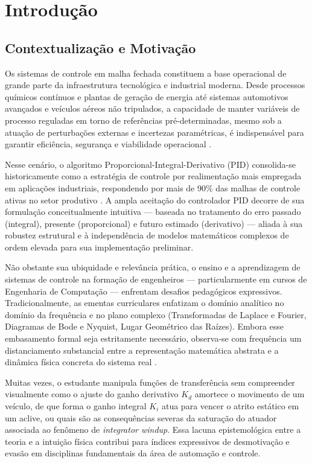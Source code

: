 \chapter{Introdução}
\label{cap:introducao}

\section{Contextualização e Motivação}
\label{sec:contextualizacao}

Os sistemas de controle em malha fechada constituem a base operacional de grande parte da infraestrutura tecnológica e industrial moderna. Desde processos químicos contínuos e plantas de geração de energia até sistemas automotivos avançados e veículos aéreos não tripulados, a capacidade de manter variáveis de processo reguladas em torno de referências pré-determinadas, mesmo sob a atuação de perturbações externas e incertezas paramétricas, é indispensável para garantir eficiência, segurança e viabilidade operacional \cite{ogata2010, dorf2017}.

Nesse cenário, o algoritmo Proporcional-Integral-Derivativo (PID) consolida-se historicamente como a estratégia de controle por realimentação mais empregada em aplicações industriais, respondendo por mais de 90\% das malhas de controle ativas no setor produtivo \cite{astrom2006, nise2020}. A ampla aceitação do controlador PID decorre de sua formulação conceitualmente intuitiva --- baseada no tratamento do erro passado (integral), presente (proporcional) e futuro estimado (derivativo) --- aliada à sua robustez estrutural e à independência de modelos matemáticos complexos de ordem elevada para sua implementação preliminar.

Não obstante sua ubiquidade e relevância prática, o ensino e a aprendizagem de sistemas de controle na formação de engenheiros --- particularmente em cursos de Engenharia de Computação --- enfrentam desafios pedagógicos expressivos. Tradicionalmente, as ementas curriculares enfatizam o domínio analítico no domínio da frequência e no plano complexo (Transformadas de Laplace e Fourier, Diagramas de Bode e Nyquist, Lugar Geométrico das Raízes). Embora esse embasamento formal seja estritamente necessário, observa-se com frequência um distanciamento substancial entre a representação matemática abstrata e a dinâmica física concreta do sistema real \cite{dormido2002}.

Muitas vezes, o estudante manipula funções de transferência sem compreender visualmente como o ajuste do ganho derivativo $K_d$ amortece o movimento de um veículo, de que forma o ganho integral $K_i$ atua para vencer o atrito estático em um aclive, ou quais são as consequências severas da saturação do atuador associada ao fenômeno de \textit{integrator windup}. Essa lacuna epistemológica entre a teoria e a intuição física contribui para índices expressivos de desmotivação e evasão em disciplinas fundamentais da área de automação e controle.

